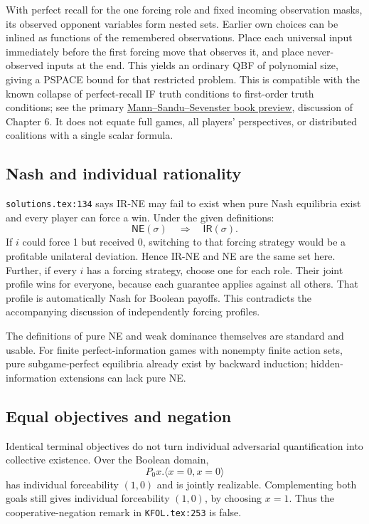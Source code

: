 \documentclass[11pt]{article}
\begin{document}
With perfect recall for the one forcing role and fixed incoming observation
masks, its observed opponent variables form nested sets. Earlier own choices
can be inlined as functions of the remembered observations. Place each universal
input immediately before the first forcing move that observes it, and place
never-observed inputs at the end. This yields an ordinary QBF of polynomial size,
giving a PSPACE bound for that restricted problem. This is compatible with the
known collapse of perfect-recall IF truth conditions to first-order truth
conditions; see the primary
\href{https://api.pageplace.de/preview/DT0400.9781139065382_A23865990/preview-9781139065382_A23865990.pdf}{Mann--Sandu--Sevenster
book preview}, discussion of Chapter 6. It does not equate full games, all
players' perspectives, or distributed coalitions with a single scalar formula.

\subsection{Nash and individual rationality}

\texttt{solutions.tex:134} says IR-NE may fail to exist when pure Nash equilibria
exist and every player can force a win. Under the given definitions:
\[
 \mathsf{NE}(\sigma)\quad\Longrightarrow\quad\mathsf{IR}(\sigma).
\]
If $i$ could force 1 but received 0, switching to that forcing strategy would
be a profitable unilateral deviation. Hence IR-NE and NE are the same set here.
Further, if every $i$ has a forcing strategy, choose one for each role. Their
joint profile wins for everyone, because each guarantee applies against all
others. That profile is automatically Nash for Boolean payoffs. This contradicts
the accompanying discussion of independently forcing profiles.

The definitions of pure NE and weak dominance themselves are standard and usable.
For finite perfect-information games with nonempty finite action sets, pure
subgame-perfect equilibria already exist by backward induction; hidden-information
extensions can lack pure NE.

\subsection{Equal objectives and negation}

Identical terminal objectives do not turn individual adversarial quantification
into collective existence. Over the Boolean domain,
\[
 P_0x.\langle x=0,x=0\rangle
\]
has individual forceability $(1,0)$ and is jointly realizable. Complementing both
goals still gives individual forceability $(1,0)$, by choosing $x=1$.
Thus the cooperative-negation remark in \texttt{KFOL.tex:253} is false.
\end{document}
